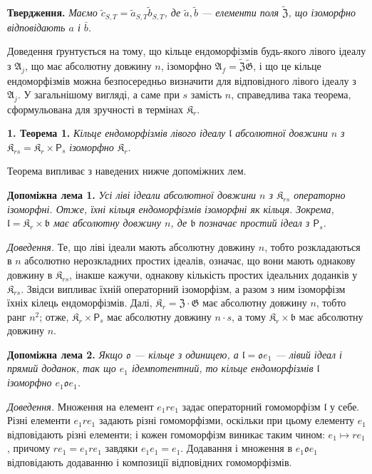 \documentclass[11pt]{article}
\begin{document}
\noindent\textbf{Твердження.} \emph{Маємо \(\tilde c_{S,T}=\tilde a_{S,T}\tilde b_{S,T}\), де \(\tilde a,\tilde b\) --- елементи поля \(\widetilde{\mathfrak Z}\), що ізоморфно відповідають \(a\) і \(\bar b\).}

Доведення ґрунтується на тому, що кільце ендоморфізмів будь-якого лівого ідеалу з \(\mathfrak A_j\), що має абсолютну довжину \(n\), ізоморфно \(\mathfrak A_f=\widetilde{\mathfrak Z}\widetilde{\mathfrak G}\), і що це кільце ендоморфізмів можна безпосередньо визначити для відповідного лівого ідеалу з \(\mathfrak A_j\). У загальнішому вигляді, а саме при \(s\) замість \(n\), справедлива така теорема, сформульована для зручності в термінах \(\mathfrak K_r\).

\noindent\textbf{1. Теорема 1.} \emph{Кільце ендоморфізмів лівого ідеалу \(\mathfrak l\) абсолютної довжини \(n\) з \(\mathfrak K_{rs}=\mathfrak K_r\times \mathsf{P}_s\) ізоморфно \(\mathfrak K_r\).}

Теорема випливає з наведених нижче допоміжних лем.

\noindent\textbf{Допоміжна лема 1.} \emph{Усі ліві ідеали абсолютної довжини \(n\) з \(\mathfrak K_{rs}\) операторно ізоморфні. Отже, їхні кільця ендоморфізмів ізоморфні як кільця. Зокрема, \(\mathfrak l=\mathfrak K_r\times\mathfrak b\) має абсолютну довжину \(n\), де \(\mathfrak b\) позначає простий ідеал з \(\mathsf{P}_s\).}

\noindent\emph{Доведення.} Те, що ліві ідеали мають абсолютну довжину \(n\), тобто розкладаються в \(n\) абсолютно нерозкладних простих ідеалів, означає, що вони мають однакову довжину в \(\mathfrak K_{rs}\), інакше кажучи, однакову кількість простих ідеальних доданків у \(\mathfrak K_{rs}\). Звідси випливає їхній операторний ізоморфізм, а разом з ним ізоморфізм їхніх кілець ендоморфізмів. Далі, \(\mathfrak K_r=\mathfrak Z\cdot\mathfrak G\) має абсолютну довжину \(n\), тобто ранг \(n^2\); отже, \(\mathfrak K_r\times \mathsf{P}_s\) має абсолютну довжину \(n\cdot s\), а тому \(\mathfrak K_r\times\mathfrak b\) має абсолютну довжину \(n\).

\noindent\textbf{Допоміжна лема 2.} \emph{Якщо \(\mathfrak o\) --- кільце з одиницею, а \(\mathfrak l=\mathfrak o e_1\) --- лівий ідеал і прямий доданок, так що \(e_1\) ідемпотентний, то кільце ендоморфізмів \(\mathfrak l\) ізоморфно \(e_1\mathfrak o e_1\).}

\noindent\emph{Доведення.} Множення на елемент \(e_1re_1\) задає операторний гомоморфізм \(\mathfrak l\) у себе. Різні елементи \(e_1re_1\) задають різні гомоморфізми, оскільки при цьому елементу \(e_1\) відповідають різні елементи; і кожен гомоморфізм виникає таким чином: \(e_1\mapsto re_1\), причому \(re_1=e_1re_1\) завдяки \(e_1e_1=e_1\). Додавання і множення в \(e_1\mathfrak o e_1\) відповідають додаванню і композиції відповідних гомоморфізмів.
\end{document}
